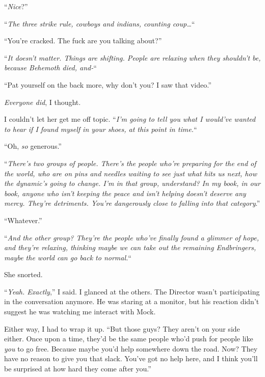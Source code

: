 ``\emph{Nice}?''



``\emph{The three strike rule, cowboys and indians, counting coup\ldots}``



``You're cracked.  The fuck are you talking about?''



``\emph{It doesn't matter.  Things are shifting.  People are relaxing when they shouldn't be, because Behemoth died, and-}``



``Pat yourself on the back more, why don't you?  I saw that video.''



\emph{Everyone did}, I thought.



I couldn't let her get me off topic.  ``\emph{I'm going to tell you what I would've wanted to hear if I found myself in your shoes, at this point in time.}``



``Oh, \emph{so} generous.''



``\emph{There's two groups of people.  There's the people who're preparing for the end of the world, who are on pins and needles waiting to see just what hits us next, how the dynamic's going to change.  I'm in that group, understand?  In my book, in our book, anyone who isn't keeping the peace and isn't helping doesn't deserve any mercy.  They're detriments.  You're dangerously close to falling into that category}.''



``Whatever.''



``\emph{And the other group?  They're the people who've finally found a glimmer of hope, and they're relaxing, thinking maybe we can take out the remaining Endbringers, maybe the world can go back to normal.}``



She snorted.



``\emph{Yeah.  Exactly},'' I said.  I glanced at the others.  The Director wasn't participating in the conversation anymore.  He was staring at a monitor, but his reaction didn't suggest he was watching me interact with Mock.



Either way, I had to wrap it up.  ``But those guys?  They aren't on your side either.  Once upon a time, they'd be the same people who'd push for people like \emph{you} to go free.  Because maybe you'd help somewhere down the road.  Now?  They have no reason to give you that slack.  You've got no help here, and I think you'll be surprised at how hard they come after you.''



